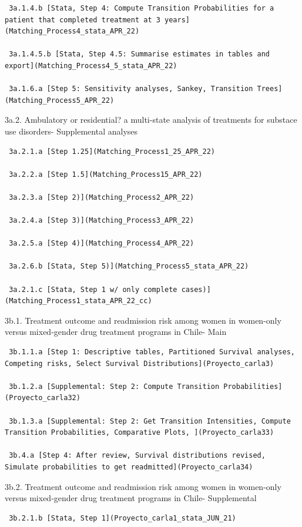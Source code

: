 \documentclass[
]{article}
\begin{document}
\begin{enumerate}
\begin{verbatim}
 3a.1.4.b [Stata, Step 4: Compute Transition Probabilities for a patient that completed treatment at 3 years](Matching_Process4_stata_APR_22)

 3a.1.4.5.b [Stata, Step 4.5: Summarise estimates in tables and export](Matching_Process4_5_stata_APR_22)

 3a.1.6.a [Step 5: Sensitivity analyses, Sankey, Transition Trees](Matching_Process5_APR_22) 
\end{verbatim}

  3a.2. Ambulatory or residential? a multi-state analysis of treatments
  for substace use disorders- Supplemental analyses

\begin{verbatim}
 3a.2.1.a [Step 1.25](Matching_Process1_25_APR_22)

 3a.2.2.a [Step 1.5](Matching_Process15_APR_22)

 3a.2.3.a [Step 2)](Matching_Process2_APR_22)

 3a.2.4.a [Step 3)](Matching_Process3_APR_22)

 3a.2.5.a [Step 4)](Matching_Process4_APR_22)

 3a.2.6.b [Stata, Step 5)](Matching_Process5_stata_APR_22)

 3a.2.1.c [Stata, Step 1 w/ only complete cases)](Matching_Process1_stata_APR_22_cc)
\end{verbatim}

  3b.1. Treatment outcome and readmission risk among women in women-only
  versus mixed-gender drug treatment programs in Chile- Main

\begin{verbatim}
 3b.1.1.a [Step 1: Descriptive tables, Partitioned Survival analyses, Competing risks, Select Survival Distributions](Proyecto_carla3)

 3b.1.2.a [Supplemental: Step 2: Compute Transition Probabilities](Proyecto_carla32)

 3b.1.3.a [Supplemental: Step 2: Get Transition Intensities, Compute Transition Probabilities, Comparative Plots, ](Proyecto_carla33)

 3b.4.a [Step 4: After review, Survival distributions revised, Simulate probabilities to get readmitted](Proyecto_carla34)
\end{verbatim}

  3b.2. Treatment outcome and readmission risk among women in women-only
  versus mixed-gender drug treatment programs in Chile- Supplemental

\begin{verbatim}
 3b.2.1.b [Stata, Step 1](Proyecto_carla1_stata_JUN_21)


\end{verbatim}
\end{enumerate}
\end{document}

